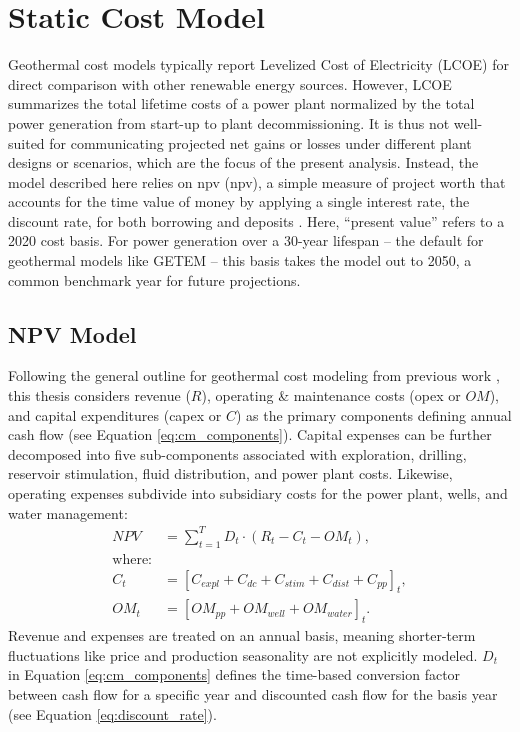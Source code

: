 \section{Static Cost Model}\label{ch4:cm_structure}

Geothermal cost models typically report Levelized Cost of Electricity (LCOE) for direct comparison with other renewable energy sources. However, LCOE summarizes the total lifetime costs of a power plant normalized by the total power generation from start-up to plant decommissioning. It is thus not well-suited for communicating projected net gains or losses under different plant designs or scenarios, which are the focus of the present analysis. Instead, the model described here relies on \acrlong{npv} (\acrshort{npv}), a simple measure of project worth that accounts for the time value of money by applying a single interest rate, the discount rate, for both borrowing and deposits \citep[p.\ 195-215]{de_neufville_flexibility_2011}. Here, ``present value'' refers to a 2020 cost basis. For power generation over a 30-year lifespan -- the default for geothermal models like GETEM \citep{entingh_volume_2006} -- this basis takes the model out to 2050, a common benchmark year for future projections. 

\subsection{NPV Model}\label{ch4:cm_npv}

Following the general outline for geothermal cost modeling from previous work \citep[e.g.,][]{augustine_hydrothermal_2009, beckers_introducing_2013,tester_future_2006}, this thesis considers revenue ($R$), operating \& maintenance costs (\acrshort{opex} or $OM$), and capital expenditures (\acrshort{capex} or $C$) as the primary components defining annual cash flow (see Equation \ref{eq:cm_components}). Capital expenses can be further decomposed into five  sub-components associated with exploration, drilling, reservoir stimulation, fluid distribution, and power plant costs. Likewise, operating expenses subdivide into subsidiary costs for the power plant, wells, and water management:
\begin{equation}
    \label{eq:cm_components}
    \begin{aligned}
    NPV &= \sum_{t=1}^{T}D_t \cdot \left( R_t - C_t - OM_t \right),\\
    \text{where:}\\
    C_t &= \left[C_{expl} + C_{dc} + C_{stim} + C_{dist} + C_{pp}\right]_t, \\
    OM_t &= \left[OM_{pp} + OM_{well} + OM_{water}\right]_t.
    \end{aligned}
\end{equation}
Revenue and expenses are treated on an annual basis, meaning shorter-term fluctuations like price and production seasonality are not explicitly modeled. $D_t$ in Equation \ref{eq:cm_components} defines the time-based conversion factor between cash flow for a specific year and discounted cash flow for the basis year (see Equation \ref{eq:discount_rate}).

